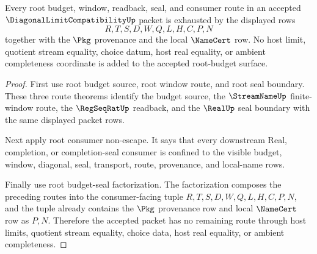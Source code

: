 \begin{theorem}
\label{thm:diagonal-limit-compatibility-root-provenance-exhaustion}
Every root budget, window, readback, seal, and consumer route in an accepted $\DiagonalLimitCompatibilityUp$ packet is exhausted by the displayed rows
$$
R,T,S,D,W,Q,L,H,C,P,N
$$
together with the $\Pkg$ provenance and the local $\NameCert$ row. No host limit, quotient stream equality, choice datum, host real equality, or ambient completeness coordinate is added to the accepted root-budget surface.
\end{theorem}
\begin{proof}
First use root budget source, root window route, and root seal boundary. These three route theorems identify the budget source, the $\StreamNameUp$ finite-window route, the $\RegSeqRatUp$ readback, and the $\RealUp$ seal boundary with the same displayed packet rows.

Next apply root consumer non-escape. It says that every downstream Real, completion, or completion-seal consumer is confined to the visible budget, window, diagonal, seal, transport, route, provenance, and local-name rows.

Finally use root budget-seal factorization. The factorization composes the preceding routes into the consumer-facing tuple $R,T,S,D,W,Q,L,H,C,P,N$, and the tuple already contains the $\Pkg$ provenance row and local $\NameCert$ row as $P,N$. Therefore the accepted packet has no remaining route through host limits, quotient stream equality, choice data, host real equality, or ambient completeness.
\end{proof}

